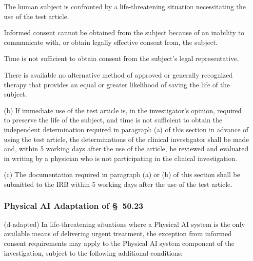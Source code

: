 \documentclass[11pt]{article}
\begin{document}
\begin{description}[leftmargin=1.0cm,style=sameline]
\item[(1)] The human subject is confronted by a life-threatening situation necessitating the use of the test article.
\item[(2)] Informed consent cannot be obtained from the subject because of an inability to communicate with, or obtain legally effective consent from, the subject.
\item[(3)] Time is not sufficient to obtain consent from the subject's legal representative.
\item[(4)] There is available no alternative method of approved or generally recognized therapy that provides an equal or greater likelihood of saving the life of the subject.
\end{description}

(b) If immediate use of the test article is, in the investigator's opinion, required to preserve the life of the subject, and time is not sufficient to obtain the independent determination required in paragraph (a) of this section in advance of using the test article, the determinations of the clinical investigator shall be made and, within 5 working days after the use of the article, be reviewed and evaluated in writing by a physician who is not participating in the clinical investigation.

(c) The documentation required in paragraph (a) or (b) of this section shall be submitted to the IRB within 5 working days after the use of the test article.

\subsubsection{Physical AI Adaptation of \S~50.23}

(d-adapted) In life-threatening situations where a Physical AI system is the only available means of delivering urgent treatment, the exception from informed consent requirements may apply to the Physical AI system component of the investigation, subject to the following additional conditions:
\end{document}
